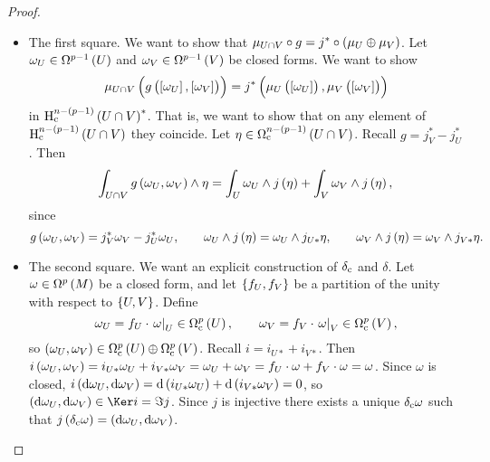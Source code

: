\begin{proof}
\begin{itemize}
\item The first square. We want to show that $ \mu_{U \cap V} \circ g = j^* \circ \br{\mu_U \oplus \mu_V} $. Let $ \omega_U \in \Omega^{p - 1}\br{U} $ and $ \omega_V \in \Omega^{p - 1}\br{V} $ be closed forms. We want to show
$$ \mu_{U \cap V}\br{g\br{\sbr{\omega_U}, \sbr{\omega_V}}} = j^*\br{\mu_U\br{\sbr{\omega_U}}, \mu_V\br{\sbr{\omega_V}}} $$
in $ \H_\c^{n - \br{p - 1}}\br{U \cap V}^* $. That is, we want to show that on any element of $ \H_\c^{n - \br{p - 1}}\br{U \cap V} $ they coincide. Let $ \eta \in \Omega_\c^{n - \br{p - 1}}\br{U \cap V} $. Recall $ g = j_V^* - j_U^* $. Then
$$ \int_{U \cap V} g\br{\omega_U, \omega_V} \wedge \eta = \int_U \omega_U \wedge j\br{\eta} + \int_V \omega_V \wedge j\br{\eta}, $$
since
$$ g\br{\omega_U, \omega_V} = j_V^*\omega_V - j_U^*\omega_U, \qquad \omega_U \wedge j\br{\eta} = \omega_U \wedge j_{U*}\eta, \qquad \omega_V \wedge j\br{\eta} = \omega_V \wedge j_{V*}\eta. $$
\item The second square. We want an explicit construction of $ \delta_{\mathrm{c}} $ and $ \delta $. Let $ \omega \in \Omega^p\br{M} $ be a closed form, and let $ \cbr{f_U, f_V} $ be a partition of the unity with respect to $ \cbr{U, V} $. Define
$$ \omega_U = f_U \cdot \eval{\omega}_U \in \Omega_\c^p\br{U}, \qquad \omega_V = f_V \cdot \eval{\omega}_V \in \Omega_\c^p\br{V}, $$
so $ \br{\omega_U, \omega_V} \in \Omega_\c^p\br{U} \oplus \Omega_\c^p\br{V} $. Recall $ i = i_{U*} + i_{V*} $. Then $ i\br{\omega_U, \omega_V} = i_{U*}\omega_U + i_{V*}\omega_V = \omega_U + \omega_V = f_U \cdot \omega + f_V \cdot \omega = \omega $. Since $ \omega $ is closed, $ i\br{\d\omega_U, \d\omega_V} = \d\br{i_{U*}\omega_U} + \d\br{i_{V*}\omega_V} = 0 $, so $ \br{\d\omega_U, \d\omega_V} \in \Ker i = \Im j $. Since $ j $ is injective there exists a unique $ \delta_{\mathrm{c}}\omega $ such that $ j\br{\delta_\c\omega} = \br{\d\omega_U, \d\omega_V} $.
\end{itemize}
\end{proof}

